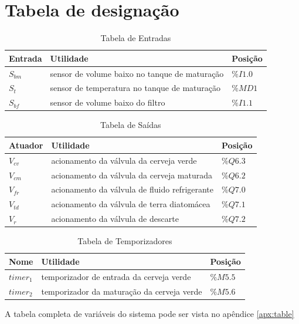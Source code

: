 \documentclass[twoside,twocolumn,12pt]{paper}
\begin{document}
\section {Tabela de designação}
\begin{table}
	\caption{Tabela de Entradas}
	\centering
	\begin{tabular}{|  p{2cm} | p{10cm} | p{2cm} | }
		\hline
		Entrada & Utilidade & Posição\\
		\hline
		$S_{bm}$ & sensor de volume baixo no tanque de maturação & $\%I1.0$ \\
		$S_t$ & sensor de temperatura no tanque de maturação & $\%MD1$ \\
		$S_{bf}$ & sensor de volume baixo do filtro & $\%I1.1$ \\
		\hline
	\end{tabular}
\end{table}


\begin{table}
	\caption{Tabela de Saídas}
	\centering
	\begin{tabular}{|  p{2cm} | p{10cm} | p{2cm} | }
		\hline
		Atuador & Utilidade & Posição\\
		\hline
  		$V_{cv}$ & acionamento da válvula da cerveja verde & $\%Q6.3$ \\
  		$V_{cm}$ & acionamento da válvula da cerveja maturada & $\%Q6.2$ \\
 		$V_{fr}$ & acionamento da válvula de fluido refrigerante & $\%Q7.0$ \\
		$V_{td}$ & acionamento da válvula de terra diatomácea & $\%Q7.1$ \\
		$V_r$ & acionamento da válvula de descarte & $\%Q7.2$ \\
 		\hline
	\end{tabular}
\end{table}


\begin{table}
	\caption{Tabela de Temporizadores}
	\centering
	\begin{tabular}{|  p{2cm} | p{10cm} | p{2cm} | }
		\hline
		Nome & Utilidade & Posição\\
		\hline
		$timer_1$ &  temporizador de entrada da cerveja verde & $\%M5.5$ \\
		$timer_2$ & temporizador da maturação da cerveja verde & $\%M5.6$ \\
		 \hline
	\end{tabular}
\end{table}

A tabela completa de variáveis do sistema pode ser vista no apêndice \ref{apx:table}
\end{document}
